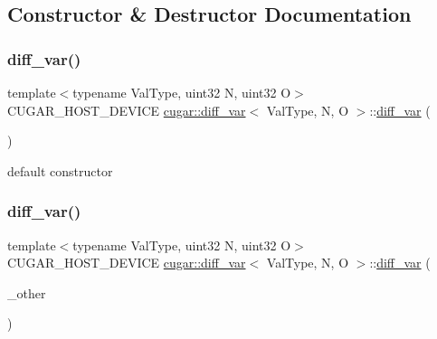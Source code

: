 \subsection{Constructor \& Destructor Documentation}
\mbox{\label{structcugar_1_1diff__var_aeb8a77349c388de8401541fa57fa2677}} 
\subsubsection{\texorpdfstring{diff\+\_\+var()}{diff\_var()}\hspace{0.1cm}{\footnotesize\ttfamily [1/4]}}
{\footnotesize\ttfamily template$<$typename Val\+Type, uint32 N, uint32 O$>$ \\
C\+U\+G\+A\+R\+\_\+\+H\+O\+S\+T\+\_\+\+D\+E\+V\+I\+CE \hyperlink{structcugar_1_1diff__var}{cugar\+::diff\+\_\+var}$<$ Val\+Type, N, O $>$\+::\hyperlink{structcugar_1_1diff__var}{diff\+\_\+var} (\begin{DoxyParamCaption}{ }\end{DoxyParamCaption})\hspace{0.3cm}{\ttfamily [inline]}}

default constructor \mbox{\label{structcugar_1_1diff__var_a2c4d3739cc2516f30278285afd992f74}} 
\subsubsection{\texorpdfstring{diff\+\_\+var()}{diff\_var()}\hspace{0.1cm}{\footnotesize\ttfamily [2/4]}}
{\footnotesize\ttfamily template$<$typename Val\+Type, uint32 N, uint32 O$>$ \\
C\+U\+G\+A\+R\+\_\+\+H\+O\+S\+T\+\_\+\+D\+E\+V\+I\+CE \hyperlink{structcugar_1_1diff__var}{cugar\+::diff\+\_\+var}$<$ Val\+Type, N, O $>$\+::\hyperlink{structcugar_1_1diff__var}{diff\+\_\+var} (\begin{DoxyParamCaption}\item[{const \hyperlink{structcugar_1_1diff__var}{diff\+\_\+var}$<$ Val\+Type, N, O $>$ \&}]{\+\_\+other }\end{DoxyParamCaption})\hspace{0.3cm}{\ttfamily [inline]}}

